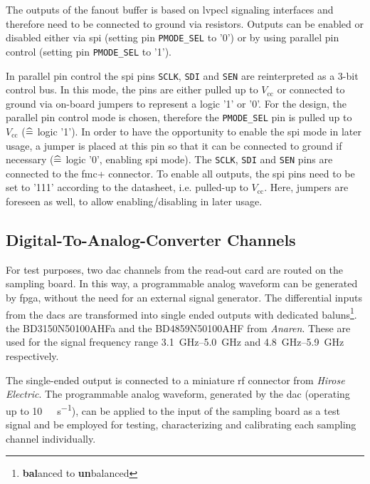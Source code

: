 The outputs of the fanout buffer is based on \gls{lvpecl} signaling interfaces and therefore need to be connected to ground via resistors.
Outputs can be enabled or disabled either via \gls{spi} (setting pin \texttt{PMODE\_SEL} to '0') or by using parallel pin control (setting pin \texttt{PMODE\_SEL} to '1'). 

In parallel pin control the \gls{spi} pins \texttt{SCLK}, \texttt{SDI} and \texttt{SEN} are reinterpreted as a 3-bit control bus.
In this mode, the pins are either pulled up to $V_\text{cc}$ or connected to ground via on-board jumpers to represent a logic '1' or '0'.
For the design, the parallel pin control mode is chosen, therefore the \texttt{PMODE\_SEL} pin is pulled up to $V_\text{cc}$ ($\mathrel{\widehat{=}}$ logic '1').
In order to have the opportunity to enable the \gls{spi} mode in later usage, a jumper is placed at this pin so that it can be connected to ground if necessary ($\mathrel{\widehat{=}}$ logic '0', enabling \gls{spi} mode).
The \texttt{SCLK}, \texttt{SDI} and \texttt{SEN} pins are connected to the \gls{fmc}+ connector.
To enable all outputs, the \gls{spi} pins need to be set to '111' according to the datasheet, i.e. pulled-up to $V_\text{cc}$. 
Here, jumpers are foreseen as well, to allow enabling/disabling in later usage.

\subsection{Digital-To-Analog-Converter Channels}
For test purposes, two \gls{dac} channels from the read-out card are routed on the sampling board.
In this way, a programmable analog waveform can be generated by \gls{fpga}, without the need for an external signal generator. 
The differential inputs from the \glspl{dac} are transformed into single ended outputs with dedicated baluns\footnote{\textbf{bal}anced to \textbf{un}balanced}. the BD3150N50100AHFa and the BD4859N50100AHF from \textit{Anaren}. 
These are used for the signal frequency range \SIrange{3.1}{5.0}{\GHz} and \SIrange{4.8}{5.9}{\GHz} respectively.

The single-ended output is connected to a miniature \gls{rf} connector from \textit{Hirose Electric}.
The programmable analog waveform, generated by the \gls{dac} (operating up to \SI{10}{\giga \sample \per \second}), can be applied to the input of the sampling board as a test signal and be employed for testing, characterizing and calibrating each sampling channel individually.

